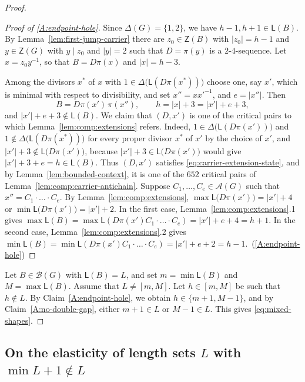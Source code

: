 \documentclass[a4paper, 10pt]{amsart}
\theoremstyle{plain}
\theoremstyle{definition}
\theoremstyle{definition}
\numberwithin{equation}{section}
\begin{document}
\begin{proof}
\begin{proof}[Proof of \ref{A:endpoint-hole}]
Since $\Delta (G) = \{1,2\}$, we have $h-1, h+1 \in \mathsf L (B)$.  By
Lemma~\ref{lem:first-jump-carrier} there are $z_0 \in \mathsf Z (B)$ with
$|z_0| = h-1$ and $y \in \mathsf Z (G)$ with $y \mid z_0$ and $|y| = 2$ such
that $D = \pi (y)$ is a $2$-$4$-sequence.  Let $x = z_0y^{-1}$, so that
$B = D\pi(x)$ and $|x| = h-3$. 

Among the divisors $x^*$ of $x$ with $1\in \Delta \big(\mathsf L(D\pi(x^*)) \big)$  choose one, say $x'$, which is
minimal with respect to divisibility, and set $x'' = x x'^{-1}$,
and $e = |x''|$.  Then
\[
 B = D\pi(x') \, \pi (x''),
 \qquad
 h = |x|+3 = |x'|+e+3 ,
\]
and $|x'|+e+3 \notin \mathsf L (B)$.  We claim that $(D,x')$ is one of the
critical pairs to which Lemma~\ref{lem:comp:extensions} refers.  Indeed, $1\in \Delta \big(\mathsf L(D\pi(x')) \big)$ and $1\notin \Delta \big(\mathsf L(D\pi(x^*)) \big)$ for every proper divisor $x^*$ of $x'$ by the choice of $x'$, and $|x'|+3\not\in \mathsf L \big(D\pi(x') \big)$,
because $|x'|+3 \in \mathsf L \big(D\pi(x') \big)$ would give
$|x'|+3+e = h \in \mathsf L (B)$.
Thus $(D,x')$ satisfies \eqref{eq:carrier-extension-state}, and by
Lemma~\ref{lem:bounded-context}, it is one of the $652$ critical pairs of
Lemma~\ref{lem:comp:carrier-antichain}. Suppose $C_1, \ldots, C_e\in \mathcal A(G)$ such that $x''=C_1\cdot \ldots\cdot C_e$.  By
Lemma~\ref{lem:comp:extensions}, $\max \mathsf L \big(D\pi(x') \big) = |x'|+4$ or
$\min \mathsf L \big(D\pi(x') \big) = |x'|+2$.  In the first case,
Lemma~\ref{lem:comp:extensions}.1 gives
$\max \mathsf L (B) = \max \mathsf L (D\pi(x')C_1\cdot \ldots \cdot  C_e) = |x'|+e+4 = h+1$.  In the
second case,  Lemma~\ref{lem:comp:extensions}.2 gives
$\min \mathsf L (B) = \min \mathsf L (D\pi(x')C_1\cdot \ldots \cdot  C_e) = |x'|+e+2 = h-1$.\qedhere\
(\ref{A:endpoint-hole})
\end{proof}


Let $B \in \mathcal B (G)$ with $\mathsf L (B)=L$, and set $m=\min \mathsf L (B)$ and $M = \max \mathsf L (B)$.
Assume that $L\neq [m,M]$. Let $h\in [m,M]$ be such that $h\notin L$. 
By
Claim~\ref{A:endpoint-hole}, we obtain $h\in \{m+1, M-1\}$, and by Claim~\ref{A:no-double-gap}, either $m+1\in L$ or $M-1\in L$.
This gives \eqref{eq:mixed-shapes}.  
\end{proof}

\smallskip
\subsection{On the elasticity of length sets $L$ with $\min L + 1 \notin L$}
\end{document}
